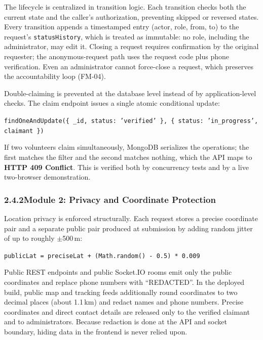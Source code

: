 \documentclass[11pt,a4paper]{article}
\newcommand{\tc}[1]{\texttt{\small #1}}
\begin{document}
The lifecycle is centralized in transition logic. Each transition checks both the current state and the caller's authorization, preventing skipped or reversed states. Every transition appends a timestamped entry (actor, role, from, to) to the request's \tc{statusHistory}, which is treated as immutable: no role, including the administrator, may edit it. Closing a request requires confirmation by the original requester; the anonymous-request path uses the request code plus phone verification. Even an administrator cannot force-close a request, which preserves the accountability loop (FM-04).

Double-claiming is prevented at the database level instead of by application-level checks. The claim endpoint issues a single atomic conditional update:

\begin{center}
\tc{findOneAndUpdate(\{ \_id, status: 'verified' \}, \{ status: 'in\_progress', claimant \})}
\end{center}

If two volunteers claim simultaneously, MongoDB serializes the operations; the first matches the filter and the second matches nothing, which the API maps to \textbf{HTTP 409 Conflict}. This is verified both by concurrency tests and by a live two-browser demonstration.

\subsubsection{2.4.2\quad Module 2: Privacy and Coordinate Protection}\label{s242}

Location privacy is enforced structurally. Each request stores a precise coordinate pair and a separate public pair produced at submission by adding random jitter of up to roughly $\pm$500\,m:

\begin{center}
\tc{publicLat = preciseLat + (Math.random() - 0.5) * 0.009}
\end{center}

Public REST endpoints and public Socket.IO rooms emit only the public coordinates and replace phone numbers with ``REDACTED''. In the deployed build, public map and tracking feeds additionally round coordinates to two decimal places (about 1.1\,km) and redact names and phone numbers. Precise coordinates and direct contact details are released only to the verified claimant and to administrators. Because redaction is done at the API and socket boundary, hiding data in the frontend is never relied upon.
\end{document}
